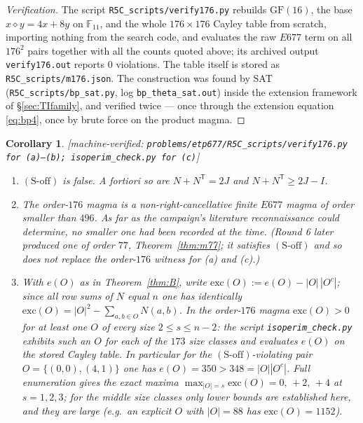 \documentclass[11pt]{article}
\theoremstyle{plain}
\newtheorem{corollary}[theorem]{Corollary}
\theoremstyle{definition}
\theoremstyle{remark}
\numberwithin{equation}{section}
\newcommand{\F}{\mathbb{F}}
\newcommand{\statusbox}[1]{{\small\sloppy\textsf{[#1]}}}
\newcommand{\MV}[1]{\statusbox{machine-verified: \texttt{#1}}}
\begin{document}
\begin{proof}[Verification]
The script \texttt{R5C\_scripts\slash verify176.py} rebuilds $\mathrm{GF}(16)$, the base
$x\diamond y = 4x+8y$ on $\F_{11}$, and the whole $176\times176$ Cayley table from scratch,
importing nothing from the search code, and evaluates the raw $E677$ term on all $176^2$
pairs together with all the counts quoted above; its archived output
\texttt{verify176.out} reports $0$ violations. The table itself is stored as
\texttt{R5C\_scripts\slash m176.json}. The construction was found by SAT
(\texttt{R5C\_scripts\slash bp\_sat.py}, log \texttt{bp\_theta\_sat.out}) inside the extension
framework of \S\ref{sec:TIfamily}, and verified twice --- once through the extension
equation \eqref{eq:bp4}, once by brute force on the product magma.
\end{proof}

\begin{corollary}\label{cor:soff}
\MV{problems\slash etp677\slash R5C\_scripts\slash verify176.py for (a)--(b);
isoperim\_check.py for (c)}
\begin{enumerate}
\item[(a)] $(\mathrm{S\text{-}off})$ is false. A fortiori so are $N+N^{\mathsf T} = 2J$ and
$N+N^{\mathsf T}\ge 2J-I$.
\item[(b)] The order-$176$ magma is a non-right-cancellative finite $E677$ magma of order
smaller than $496$. As far as the campaign's literature reconnaissance \cite{R4} could
determine, no smaller one had been recorded at the time. (Round 6 later produced one of
order $77$, Theorem~\ref{thm:m77}; it satisfies $(\mathrm{S\text{-}off})$ and so does not
replace the order-$176$ witness for (a) and (c).)
\item[(c)] With $e(O)$ as in Theorem~\ref{thm:B}, write
$\mathrm{exc}(O) := e(O)-|O|\,|O^{c}|$; since all row sums of $N$ equal $n$ one has
identically $\mathrm{exc}(O) = |O|^2 - \sum_{a,b\in O}N(a,b)$. In the order-$176$ magma
$\mathrm{exc}(O)>0$ for at least one $O$ of \emph{every} size $2\le s\le n-2$: the script
\texttt{isoperim\_check.py} exhibits such an $O$ for each of the $173$ size classes and
evaluates $e(O)$ on the stored Cayley table. In particular for the
$(\mathrm{S\text{-}off})$-violating
pair $O = \{(0,0),(4,1)\}$ one has $e(O) = 350 > 348 = |O||O^c|$. Full enumeration gives the
exact maxima $\max_{|O|=s}\mathrm{exc}(O) = 0,\,+2,\,+4$ at $s=1,2,3$; for the middle size
classes only lower bounds are established here, and they are large (e.g.\ an explicit $O$
with $|O|=88$ has $\mathrm{exc}(O) = 1152$).
\end{enumerate}
\end{corollary}
\end{document}
